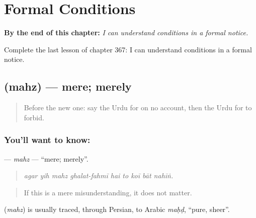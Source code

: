 
\chapter{Formal Conditions}
\label{ch:ur-formal-conditions}

\begin{chapteropening}
\textbf{By the end of this chapter:} \emph{I can understand conditions in a formal notice.}

Complete the last lesson of chapter 367: I can understand conditions in a formal notice.
\end{chapteropening}

\section[\texorpdfstring{\ur{محض} (mahz)}{محض (mahz)}]{ (mahz) — mere; merely}

\label{lesson:UR-C367-mahz}



\begin{quote}
Before the new one: say the Urdu for on no account, then the Urdu for to forbid.
\end{quote}

\subsection*{You'll want to know: }
\textbf{} — \emph{mahz} — \textquotedblleft{}mere; merely\textquotedblright{}.

\begin{quote}
         
\end{quote}

\begin{quote}
\emph{agar yih mahz ghalat-fahmī hai to koī bāt nahīṅ.}
\end{quote}

\begin{quote}
If this is a mere misunderstanding, it does not matter.
\end{quote}

\begin{cousinweb}
\textbf{} (\emph{mahz}) is usually traced, through Persian, to Arabic \emph{maḥḍ}, \textquotedblleft{}pure, sheer\textquotedblright{}.
\end{cousinweb}


